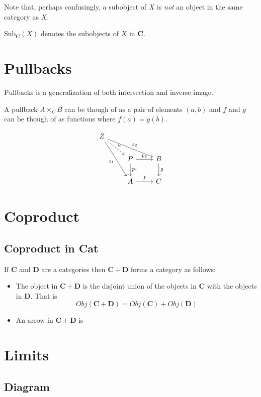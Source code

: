 \documentclass{book}
\theoremstyle{definition}
\begin{document}
Note that, perhaps confusingly, a subobject of $X$ is \emph{not} an object in
the same category as $X$.

$\text{Sub}_{\mathbf{C}}(X)$ denotes the subobjects of $X$ in \textbf{C}.

\section{Pullbacks}

Pullbacks is a generalization of both intersection and inverse
image. %

A pullback $A \times_{C} B$ can be though of as a pair of elements $(a, b)$ and
$f$ and $g$ can be though of as functions where $f(a) = g(b)$.

\[
  \begin{tikzcd}
    Z \ar[dr, dashed, "u"] \ar[drr, "z_{2}"] \ar[ddr, "z_{1}"'] & & \\
    & P \ar[r, "p_{2}"] \ar[d, "p_{1}"] & B \ar[d, "g"] \\
    & A \ar[r, "f"] & C
  \end{tikzcd}
\]

\section{Coproduct}

\subsection{Coproduct in \textbf{Cat}}

If \textbf{C} and \textbf{D} are a categories then $\mathbf{C} + \mathbf{D}$
forms a category as follows:

\begin{itemize}
\item The object in $\mathbf{C} + \mathbf{D}$ is the disjoint union of the
  objects in $\mathbf{C}$ with the objects in $\mathbf{D}$. That is
  \[
    Obj(\mathbf{C} + \mathbf{D}) = Obj(\mathbf{C}) + Obj(\mathbf{D})
  \]
\item An arrow in $\mathbf{C} + \mathbf{D}$ is 
\end{itemize}

\section{Limits}

\subsection{Diagram}
\end{document}

